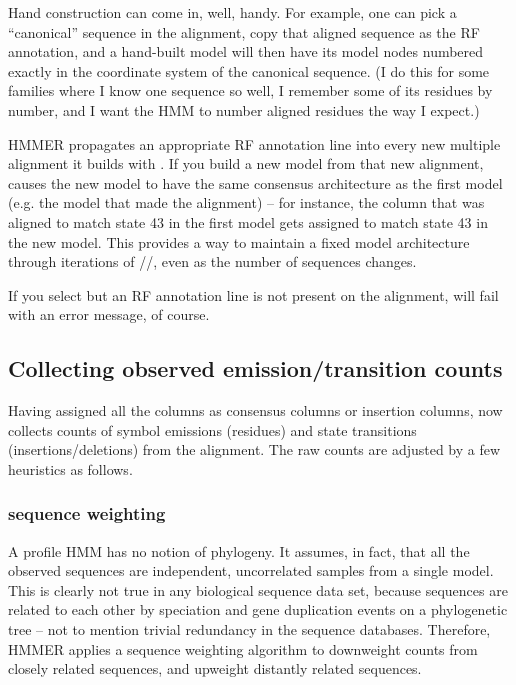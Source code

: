 Hand construction can come in, well, handy. For example, one can pick
a ``canonical'' sequence in the alignment, copy that aligned sequence
as the RF annotation, and a hand-built model will then have its model
nodes numbered exactly in the coordinate system of the canonical
sequence. (I do this for some families where I know one sequence so
well, I remember some of its residues by number, and I want the HMM to
number aligned residues the way I expect.)

HMMER propagates an appropriate RF annotation line into every new
multiple alignment it builds with . If you build a new
model from that new alignment,  causes the new
model to have the same consensus architecture as the first model
(e.g. the model that made the alignment) -- for instance, the column
that was aligned to match state 43 in the first model gets assigned to
match state 43 in the new model. This provides a way to maintain a
fixed model architecture through iterations of
//, even as the number
of sequences changes.

If you select  but an RF annotation line is not present
on the alignment,  will fail with an error message, of
course.

\subsection{Collecting observed emission/transition counts}

Having assigned all the columns as consensus columns or insertion
columns,  now collects counts of symbol emissions
(residues) and state transitions (insertions/deletions) from the
alignment. The raw counts are adjusted by a few heuristics as follows.

\subsubsection{sequence weighting}

A profile HMM has no notion of phylogeny. It assumes, in fact, that
all the observed sequences are independent, uncorrelated samples from
a single model. This is clearly not true in any biological sequence
data set, because sequences are related to each other by speciation
and gene duplication events on a phylogenetic tree -- not to mention
trivial redundancy in the sequence databases. Therefore, HMMER applies
a sequence weighting algorithm to downweight counts from closely
related sequences, and upweight distantly related sequences.

